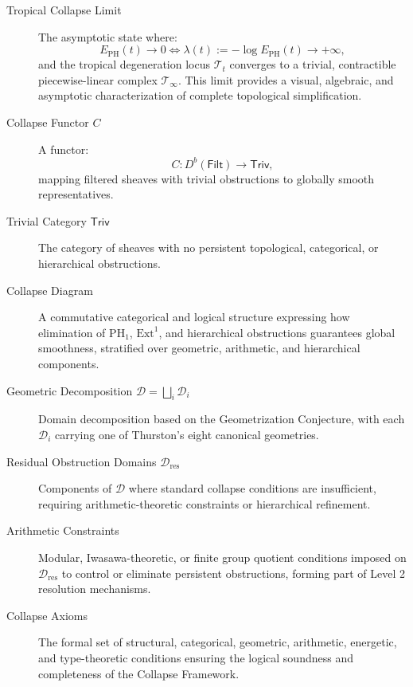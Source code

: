 \documentclass[11pt]{article}
\begin{document}
\begin{description}
  \item[Tropical Collapse Limit]  
  The asymptotic state where:
  \[
  E_{\mathrm{PH}}(t) \to 0 \iff \lambda(t) := -\log E_{\mathrm{PH}}(t) \to +\infty,
  \]
  and the tropical degeneration locus $\mathcal{T}_t$ converges to a trivial, contractible piecewise-linear complex $\mathcal{T}_\infty$. This limit provides a visual, algebraic, and asymptotic characterization of complete topological simplification.

  \item[Collapse Functor $C$]  
  A functor:
  \[
  C : D^b(\mathsf{Filt}) \to \mathsf{Triv},
  \]
  mapping filtered sheaves with trivial obstructions to globally smooth representatives.

  \item[Trivial Category $\mathsf{Triv}$]  
  The category of sheaves with no persistent topological, categorical, or hierarchical obstructions.

  \item[Collapse Diagram]  
  A commutative categorical and logical structure expressing how elimination of $\mathrm{PH}_1$, $\mathrm{Ext}^1$, and hierarchical obstructions guarantees global smoothness, stratified over geometric, arithmetic, and hierarchical components.

  \item[Geometric Decomposition $\mathcal{D} = \bigsqcup_i \mathcal{D}_i$]  
  Domain decomposition based on the Geometrization Conjecture, with each $\mathcal{D}_i$ carrying one of Thurston's eight canonical geometries.

  \item[Residual Obstruction Domains $\mathcal{D}_{\mathrm{res}}$]  
  Components of $\mathcal{D}$ where standard collapse conditions are insufficient, requiring arithmetic-theoretic constraints or hierarchical refinement.

  \item[Arithmetic Constraints]  
  Modular, Iwasawa-theoretic, or finite group quotient conditions imposed on $\mathcal{D}_{\mathrm{res}}$ to control or eliminate persistent obstructions, forming part of Level 2 resolution mechanisms.

  \item[Collapse Axioms]  
  The formal set of structural, categorical, geometric, arithmetic, energetic, and type-theoretic conditions ensuring the logical soundness and completeness of the Collapse Framework.

\end{description}
\end{document}
